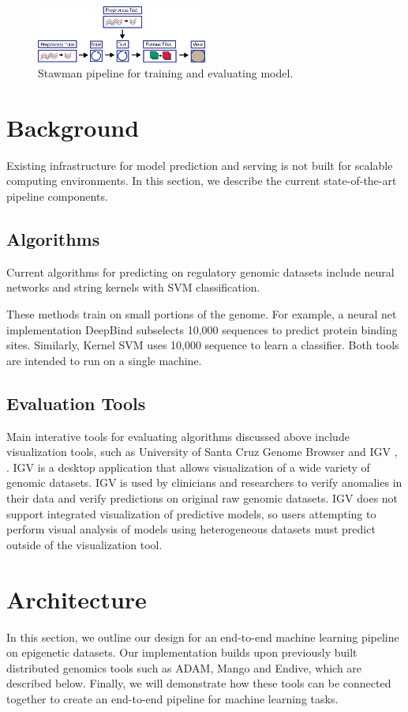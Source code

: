 \documentclass{sig-alternate-05-2015}
\begin{document}
\begin{figure}
  \label{fig:strawmanPipeline}
  \includegraphics[width=0.5\textwidth]{figures/strawman.png}
  \caption{Stawman pipeline for training and evaluating model.}
\end{figure}

\section{Background}
Existing infrastructure for model prediction and serving is not built for scalable computing environments. In this section, we describe the current state-of-the-art pipeline components.

\subsection{Algorithms}
Current algorithms for predicting on regulatory genomic datasets include neural networks and string kernels with SVM classification.

These methods train on small portions of the genome. For example, a neural net implementation DeepBind subselects 10,000 sequences to predict protein binding sites. Similarly, Kernel SVM uses 10,000 sequence to learn a classifier. Both tools are intended to run on a single machine. \\

\subsection{Evaluation Tools}
Main interative tools for evaluating algorithms discussed above include visualization tools, such as University of Santa Cruz Genome Browser and IGV \cite{ucscbrowser}, \cite{igv2011}. IGV is a desktop application that allows visualization of a wide variety of genomic datasets. IGV is used by clinicians and researchers to verify anomalies in their data and verify predictions on original raw genomic datasets. IGV does not support integrated visualization of predictive models, so users attempting to perform visual analysis of models using heterogeneous datasets must predict outside of the visualization tool.

\section{Architecture}
In this section, we outline our design for an end-to-end machine learning pipeline on epigenetic datasets. Our implementation builds upon previously built distributed genomics tools such as ADAM, Mango and Endive, which are described below. Finally, we will demonstrate how these tools can be connected together to create an end-to-end pipeline for machine learning tasks. \\
\end{document}
